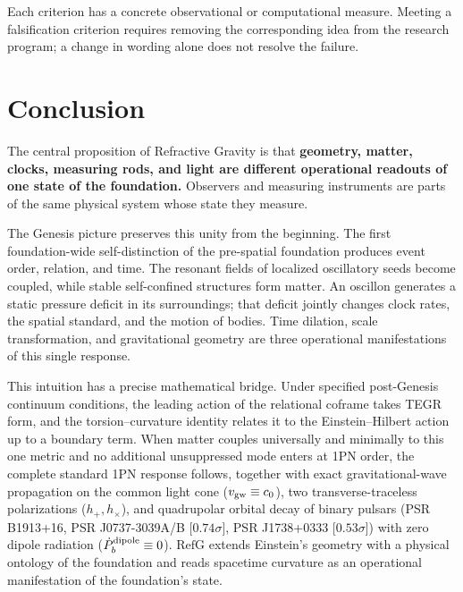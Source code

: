 \documentclass[11pt,a4paper]{article}
\newcommand{\RefG}{\mathrm{RefG}}
\begin{document}
Each criterion has a concrete observational or computational measure. Meeting a falsification criterion requires removing the corresponding idea from the research program; a change in wording alone does not resolve the failure.

\section*{Conclusion}

The central proposition of Refractive Gravity is that \textbf{geometry, matter, clocks, measuring rods, and light are different operational readouts of one state of the foundation.} Observers and measuring instruments are parts of the same physical system whose state they measure.

The Genesis picture preserves this unity from the beginning. The first foundation-wide self-distinction of the pre-spatial foundation produces event order, relation, and time. The resonant fields of localized oscillatory seeds become coupled, while stable self-confined structures form matter. An oscillon generates a static pressure deficit in its surroundings; that deficit jointly changes clock rates, the spatial standard, and the motion of bodies. Time dilation, scale transformation, and gravitational geometry are three operational manifestations of this single response.

This intuition has a precise mathematical bridge. Under specified post-Genesis continuum conditions, the leading action of the relational coframe takes TEGR form, and the torsion--curvature identity relates it to the Einstein--Hilbert action up to a boundary term. When matter couples universally and minimally to this one metric and no additional unsuppressed mode enters at 1PN order, the complete standard 1PN response follows, together with exact gravitational-wave propagation on the common light cone ($v_{\rm gw} \equiv c_0$), two transverse-traceless polarizations ($h_+, h_\times$), and quadrupolar orbital decay of binary pulsars (PSR B1913+16, PSR J0737-3039A/B [$0.74\sigma$], PSR J1738+0333 [$0.53\sigma$]) with zero dipole radiation ($\dot{P}_b^{\rm dipole} \equiv 0$). $\RefG$ extends Einstein's geometry with a physical ontology of the foundation and reads spacetime curvature as an operational manifestation of the foundation's state.
\end{document}
